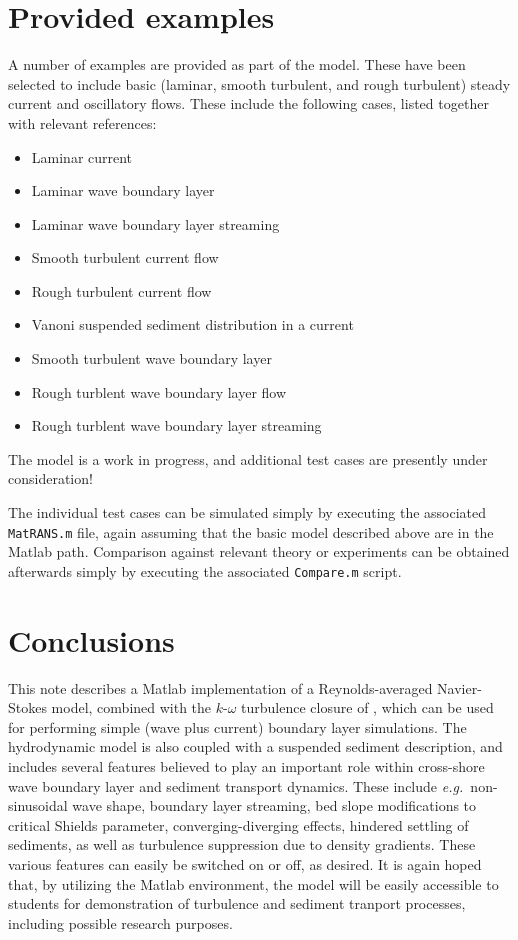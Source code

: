 \documentclass[12pt]{article}
\newcommand{\eg}{{\it e.g.\ }}
\newcommand{\bibpath}{/home/drfu/Latex/Papers/BibTeX} %
\begin{document}
\section{Provided examples}

A number of examples are provided as part of the model.  These have
been selected to include basic (laminar, smooth turbulent, and rough
turbulent) steady current and oscillatory flows.  These include the
following cases, listed together with relevant references:
%
\begin{itemize}
\item Laminar current
\item Laminar wave boundary layer
\item Laminar wave boundary layer streaming \citep{Longuet-Higgins1953}
\item Smooth turbulent current flow \citep[][]{Fuhrmanetal2010}
\item Rough turbulent current flow \citep[][]{Fuhrmanetal2010}
\item Vanoni suspended sediment distribution in a current
\item Smooth turbulent wave boundary layer \citep[][]{Jensenetal1989}
\item Rough turblent wave boundary layer flow \citep[][]{Jensenetal1989}
\item Rough turblent wave boundary layer streaming
  \citep[][]{HolmedalMyrhaug2009}
\end{itemize}
%
The model is a work in progress, and additional test cases are
presently under consideration!

The individual test cases can be simulated simply by executing the
associated \texttt{MatRANS.m} file, again assuming that the basic
model described above are in the Matlab path.  Comparison against
relevant theory or experiments can be obtained afterwards simply by
executing the associated \texttt{Compare.m} script.



\section{Conclusions}
\label{sec:Conclusions}

This note describes a Matlab implementation of a Reynolds-averaged
Navier-Stokes model, combined with the $k$-$\omega$ turbulence closure
of \cite{Wilcox2006}, which can be used for performing simple (wave
plus current) boundary layer simulations.  The hydrodynamic model is
also coupled with a suspended sediment description, and includes
several features believed to play an important role within cross-shore
wave boundary layer and sediment transport dynamics.  These include
\eg non-sinusoidal wave shape, boundary layer streaming, bed slope
modifications to critical Shields parameter, converging-diverging
effects, hindered settling of sediments, as well as turbulence
suppression due to density gradients.  These various features can
easily be switched on or off, as desired.  It is again hoped that, by
utilizing the Matlab environment, the model will be easily accessible
to students for demonstration of turbulence and sediment tranport
processes, including possible research purposes.



\end{document}
